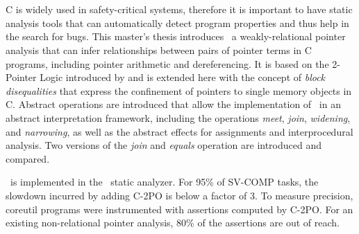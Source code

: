 \chapter{\abstractname}

C is widely used in safety-critical systems, therefore it is important to have static analysis tools that can automatically detect program properties and thus help in the search for bugs.
This master's thesis introduces \cpo\, a weakly-relational pointer analysis that can infer relationships between pairs of pointer terms in C programs, including pointer arithmetic and dereferencing.
It is based on the 2-Pointer Logic introduced by \textcite{2pointer} and is extended here with the concept of \emph{block disequalities} that express the confinement of pointers to single memory objects in C.
Abstract operations are introduced that allow the implementation of \cpo\ in an abstract interpretation framework, including the operations \emph{meet}, \emph{join}, \emph{widening}, and \emph{narrowing}, as well as the abstract effects for assignments and interprocedural analysis.
Two versions of the \emph{join} and \emph{equals} operation are introduced and compared.

\cpo\ is implemented in the \goblint\ static analyzer.
For 95\% of SV-COMP tasks, the slowdown incurred by adding
C-2PO is below a factor of 3. To measure precision, coreutil programs were instrumented with assertions computed by C-2PO.
For an existing non-relational pointer analysis, 80\% of the assertions are out of reach.
